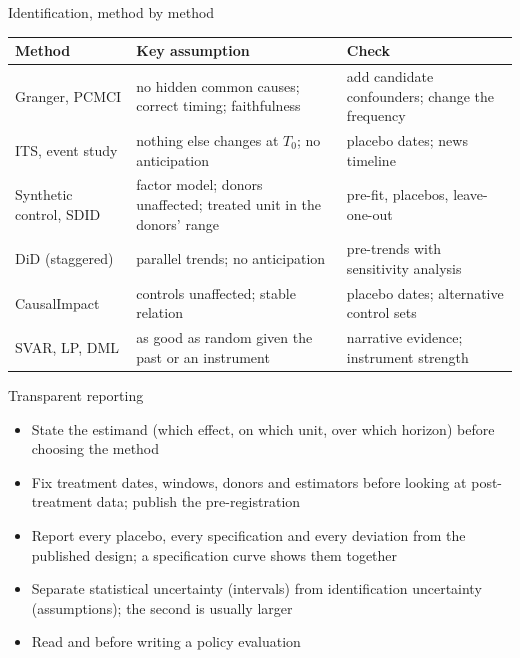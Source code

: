 \begin{frame}{Identification, method by method}
\itemsize{\small}
\begin{center}
\scriptsize
\begin{tabular}{>{\raggedright\arraybackslash}p{2.6cm}>{\raggedright\arraybackslash}p{5.4cm}>{\raggedright\arraybackslash}p{4.4cm}}
\toprule
\textbf{Method} & \textbf{Key assumption} & \textbf{Check} \\
\midrule
Granger, PCMCI & no hidden common causes; correct timing; faithfulness & add candidate confounders; change the frequency \\
ITS, event study & nothing else changes at $T_0$; no anticipation & placebo dates; news timeline \\
Synthetic control, SDID & factor model; donors unaffected; treated unit in the donors' range & pre-fit, placebos, leave-one-out \\
DiD (staggered) & parallel trends; no anticipation & pre-trends with sensitivity analysis \\
CausalImpact & controls unaffected; stable relation & placebo dates; alternative control sets \\
SVAR, LP, DML & as good as random given the past or an instrument & narrative evidence; instrument strength \\
\bottomrule
\end{tabular}
\end{center}
\end{frame}

\begin{frame}{Transparent reporting}
\itemsize{\small}
\begin{itemize}
    \item State the estimand (which effect, on which unit, over which horizon) before choosing the method
    \item Fix treatment dates, windows, donors and estimators before looking at post-treatment data; publish the pre-registration
    \item Report every placebo, every specification and every deviation from the published design; a specification curve shows them together
    \item Separate statistical uncertainty (intervals) from identification uncertainty (assumptions); the second is usually larger
    \item Read  and  before writing a policy evaluation
\end{itemize}
\end{frame}


